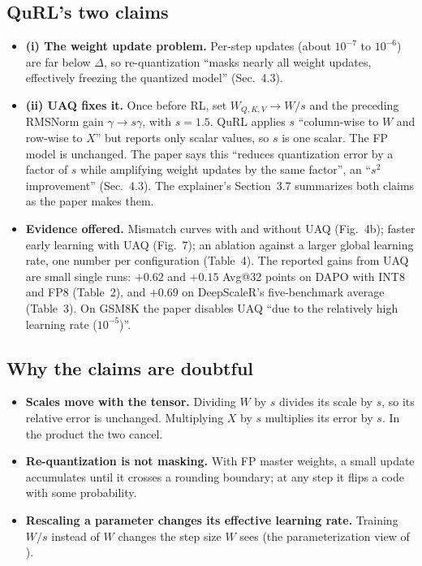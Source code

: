 \documentclass[11pt]{article}
\begin{document}
\subsection{QuRL's two claims}\label{sec:claims}
\begin{itemize}
\item \textbf{(i) The weight update problem.} Per-step updates (about $10^{-7}$ to $10^{-6}$) are far below $\Delta$, so re-quantization ``masks nearly all weight updates, effectively freezing the quantized model'' (Sec.~4.3).
\item \textbf{(ii) UAQ fixes it.} Once before RL, set $W_{Q,K,V}\to W/s$ and the preceding RMSNorm gain $\gamma\to s\gamma$, with $s=1.5$. QuRL applies $s$ ``column-wise to $W$ and row-wise to $X$'' but reports only scalar values, so $s$ is one scalar. The FP model is unchanged. The paper says this ``reduces quantization error by a factor of $s$ while amplifying weight updates by the same factor'', an ``$s^2$ improvement'' (Sec.~4.3). The explainer's Section~3.7 summarizes both claims as the paper makes them.
\item \textbf{Evidence offered.} Mismatch curves with and without UAQ (Fig.~4b); faster early learning with UAQ (Fig.~7); an ablation against a larger global learning rate, one number per configuration (Table~4). The reported gains from UAQ are small single runs: $+0.62$ and $+0.15$ Avg@32 points on DAPO with INT8 and FP8 (Table~2), and $+0.69$ on DeepScaleR's five-benchmark average (Table~3). On GSM8K the paper disables UAQ ``due to the relatively high learning rate ($10^{-5}$)''.
\end{itemize}

\subsection{Why the claims are doubtful}
\begin{itemize}
\item \textbf{Scales move with the tensor.} Dividing $W$ by $s$ divides its scale by $s$, so its relative error is unchanged. Multiplying $X$ by $s$ multiplies its error by $s$. In the product the two cancel.
\item \textbf{Re-quantization is not masking.} With FP master weights, a small update accumulates until it crosses a rounding boundary; at any step it flips a code with some probability.
\item \textbf{Rescaling a parameter changes its effective learning rate.} Training $W/s$ instead of $W$ changes the step size $W$ sees (the parameterization view of \citealp{yang2021tp4,yang2022tp5}).
\end{itemize}
\end{document}
